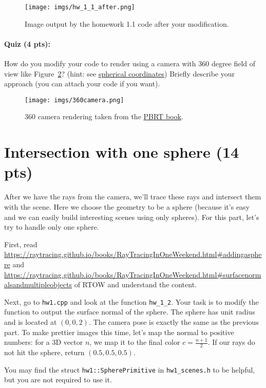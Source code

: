 \begin{figure}[ht]
    \centering
    \texttt{[image: imgs/hw\_1\_1\_after.png]}
    \caption{Image output by the homework 1.1 code after your modification.}
    \label{fig:hw_1_1_after}
\end{figure}

\paragraph{Quiz (4 pts):} How do you modify your code to render using a camera with 360 degree field of view like Figure~\ref{fig:360_camera}? (hint: see \href{https://en.wikipedia.org/wiki/Spherical_coordinate_system}{spherical coordinates}) Briefly describe your approach (you can attach your code if you want).
\begin{figure}[ht]
    \centering
    \texttt{[image: imgs/360camera.png]}
    \caption{360 camera rendering taken from the \href{https://www.pbr-book.org/3ed-2018/Camera_Models/Environment_Camera}{PBRT book}.}
    \label{fig:360_camera}
\end{figure}

\section{Intersection with one sphere (14 pts)}
After we have the rays from the camera, we'll trace these rays and intersect them with the scene. Here we choose the geometry to be a sphere (because it's easy and we can easily build interesting scenes using only spheres). For this part, let's try to handle only one sphere.

First, read \href{Chapter 5}{https://raytracing.github.io/books/RayTracingInOneWeekend.html\#addingasphere} and \href{Chapter 6}{https://raytracing.github.io/books/RayTracingInOneWeekend.html\#surfacenormalsandmultipleobjects} of RTOW and understand the content.

Next, go to \lstinline{hw1.cpp} and look at the function \lstinline{hw_1_2}. Your task is to modify the function to output the surface normal of the sphere. The sphere has unit radius and is located at $(0, 0, 2)$. The camera pose is exactly the same as the previous part. To make prettier images this time, let's map the normal to positive numbers: for a 3D vector $n$, we map it to the final color $c = \frac{n + 1}{2}$. If our rays do not hit the sphere, return $(0.5, 0.5, 0.5)$.

You may find the struct \lstinline{hw1::SpherePrimitive} in \lstinline{hw1_scenes.h} to be helpful, but you are not required to use it.

